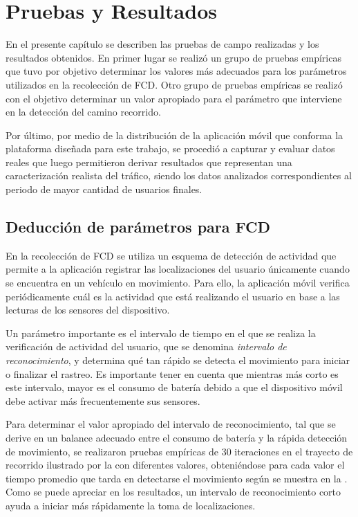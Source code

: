 \chapter{Pruebas y Resultados}
\label{cap:7}

En el presente capítulo se describen las pruebas de campo realizadas y los resultados obtenidos. En primer lugar se realizó un grupo de pruebas empíricas que tuvo por objetivo determinar los valores más adecuados para los parámetros utilizados en la recolección de FCD. Otro grupo de pruebas empíricas se realizó con el objetivo determinar un valor apropiado para el parámetro que interviene en la detección del camino recorrido.

Por último, por medio de la distribución de la aplicación móvil que conforma la plataforma diseñada para este trabajo, se procedió a capturar y evaluar datos reales que luego permitieron derivar resultados que representan una caracterización realista del tráfico, siendo los datos analizados correspondientes al periodo de mayor cantidad de usuarios finales.

\section{Deducción de parámetros para FCD}

En la recolección de FCD se utiliza un esquema de detección de actividad que permite a la aplicación registrar las localizaciones del usuario únicamente cuando se encuentra en un vehículo en movimiento. Para ello, la aplicación móvil verifica periódicamente cuál es la actividad que está realizando el usuario en base a las lecturas de los sensores del dispositivo. 

Un parámetro importante es el intervalo de tiempo en el que se realiza la verificación de actividad del usuario, que se denomina \emph{intervalo de reconocimiento}, y determina qué tan rápido se detecta el movimiento para iniciar o finalizar el rastreo. Es importante tener en cuenta que mientras más corto es este intervalo, mayor es el consumo de batería debido a que el dispositivo móvil debe activar más frecuentemente sus sensores. 

Para determinar el valor apropiado del intervalo de reconocimiento, tal que se derive en un balance adecuado entre el consumo de batería y la rápida detección de movimiento, se realizaron pruebas empíricas de 30 iteraciones en el trayecto de recorrido ilustrado por la  con diferentes valores, obteniéndose para cada valor el tiempo promedio que tarda en detectarse el movimiento según se muestra en la . Como se puede apreciar en los resultados, un intervalo de reconocimiento corto ayuda a iniciar más rápidamente la toma de localizaciones.

